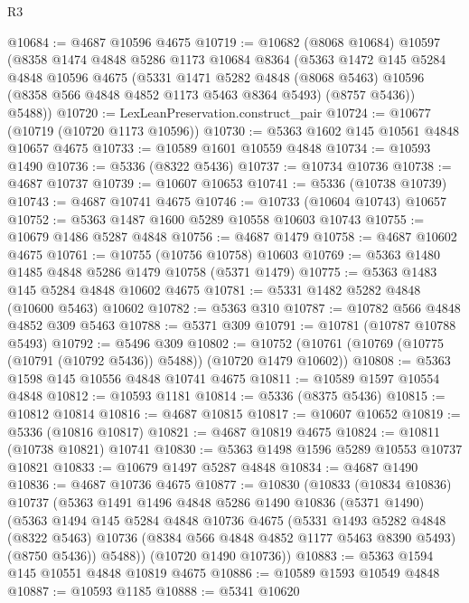 \begin{lexlean}{R3}
\begin{coremodule}
@10684 := @4687 @10596 @4675
@10719 := @10682
    (@8068 @10684)
    @10597
    (@8358
      @1474
      @4848
      @5286
      @1173
      @10684
      @8364
      (@5363
        @1472
        @145
        @5284
        @4848
        @10596
        @4675
        (@5331
          @1471
          @5282
          @4848
          (@8068 @5463)
          @10596
          (@8358 @566 @4848 @4852 @1173 @5463 @8364 @5493)
          (@8757 @5436))
        @5488))
@10720 := LexLeanPreservation.construct_pair
@10724 := @10677 (@10719 (@10720 @1173 @10596))
@10730 := @5363 @1602 @145 @10561 @4848 @10657 @4675
@10733 := @10589 @1601 @10559 @4848
@10734 := @10593 @1490
@10736 := @5336 (@8322 @5436)
@10737 := @10734 @10736
@10738 := @4687 @10737
@10739 := @10607 @10653
@10741 := @5336 (@10738 @10739)
@10743 := @4687 @10741 @4675
@10746 := @10733 (@10604 @10743) @10657
@10752 := @5363 @1487 @1600 @5289 @10558 @10603 @10743
@10755 := @10679 @1486 @5287 @4848
@10756 := @4687 @1479
@10758 := @4687 @10602 @4675
@10761 := @10755 (@10756 @10758) @10603
@10769 := @5363 @1480 @1485 @4848 @5286 @1479 @10758 (@5371 @1479)
@10775 := @5363 @1483 @145 @5284 @4848 @10602 @4675
@10781 := @5331 @1482 @5282 @4848 (@10600 @5463) @10602
@10782 := @5363 @310
@10787 := @10782 @566 @4848 @4852 @309 @5463
@10788 := @5371 @309
@10791 := @10781 (@10787 @10788 @5493)
@10792 := @5496 @309
@10802 := @10752 (@10761 (@10769 (@10775 (@10791 (@10792 @5436)) @5488)) (@10720 @1479 @10602))
@10808 := @5363 @1598 @145 @10556 @4848 @10741 @4675
@10811 := @10589 @1597 @10554 @4848
@10812 := @10593 @1181
@10814 := @5336 (@8375 @5436)
@10815 := @10812 @10814
@10816 := @4687 @10815
@10817 := @10607 @10652
@10819 := @5336 (@10816 @10817)
@10821 := @4687 @10819 @4675
@10824 := @10811 (@10738 @10821) @10741
@10830 := @5363 @1498 @1596 @5289 @10553 @10737 @10821
@10833 := @10679 @1497 @5287 @4848
@10834 := @4687 @1490
@10836 := @4687 @10736 @4675
@10877 := @10830
    (@10833
      (@10834 @10836)
      @10737
      (@5363
        @1491
        @1496
        @4848
        @5286
        @1490
        @10836
        (@5371 @1490)
        (@5363
          @1494
          @145
          @5284
          @4848
          @10736
          @4675
          (@5331
            @1493
            @5282
            @4848
            (@8322 @5463)
            @10736
            (@8384 @566 @4848 @4852 @1177 @5463 @8390 @5493)
            (@8750 @5436))
          @5488))
      (@10720 @1490 @10736))
@10883 := @5363 @1594 @145 @10551 @4848 @10819 @4675
@10886 := @10589 @1593 @10549 @4848
@10887 := @10593 @1185
@10888 := @5341 @10620

\end{coremodule}
\end{lexlean}
